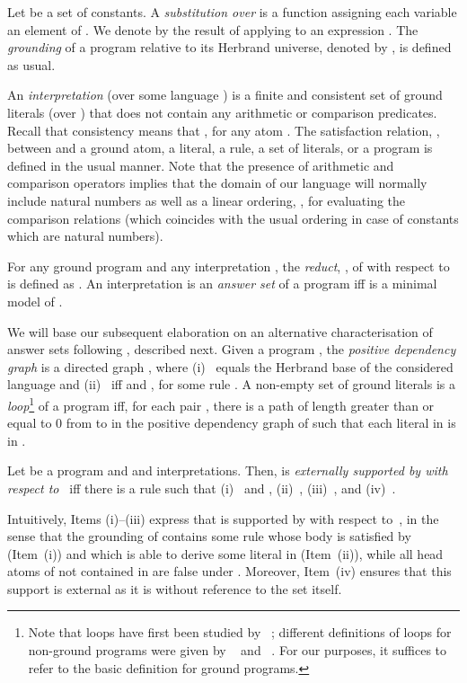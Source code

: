 \documentclass{tlp}
\newcommand{\wrt}{with respect to}
\begin{document}
Let  be a set of constants. A \emph{substitution over}  is a function  assigning each variable an element of .
We denote by  the result of applying  to an expression .
The \emph{grounding} of a  program  relative to its Herbrand universe, denoted by , is defined as usual.

An \emph{interpretation}  (over some language ) is a finite and consistent set of ground literals (over ) that does not contain any arithmetic or comparison predicates.
Recall that consistency means that , for any atom .
The satisfaction relation, , between  and a ground atom, a literal, 
a rule, a set of literals, or a program  is defined in the usual manner.
Note that the presence of arithmetic and comparison operators implies that the domain of our language will normally include natural numbers as well as a linear ordering, , 
for evaluating the comparison relations (which coincides with the usual ordering in case of constants which are natural numbers).

For any ground program  and any interpretation , the \emph{reduct}, , of  \wrt\  \cite{gelfond91}
is defined as 
.
An interpretation  is an \emph{answer set} of a program  iff  is  a minimal model of .


We will base our subsequent elaboration on an alternative characterisation of answer sets following , described next.
Given a program ,  the \emph{positive dependency graph} is a directed
graph , where 
(i)~ equals the Herbrand base of the considered language  and
(ii)~ iff  and , for some rule .
A non-empty set  of ground literals is  a \emph{loop}\footnote{Note that loops have first been studied by ~\citeyear{lin04}; different definitions of loops for non-ground programs were given by ~\citeyear{chen06} and ~\citeyear{lee08}.
For our purposes, it suffices to refer to the basic definition for ground programs.} of  a  program  iff,
for each pair ,
there is a path  of length greater than or equal to 0 from  to 
in the positive dependency graph of  such that each literal in 
is in . 

Let  be a program and  and  interpretations. Then,
 is \emph{externally supported by  \wrt\ } iff
there is a rule  
such that
(i)~ and ,
(ii)~,
(iii)~, and
(iv)~.

Intuitively, Items (i)--(iii) express that  is supported by  \wrt\ , in the sense that the grounding of  contains some rule  whose body is satisfied by  (Item~(i)) and which is able to derive some literal in  (Item~(ii)), while all head atoms of  not contained in  are false under .
Moreover, Item~(iv) ensures that this support is external as it is without
reference to the set  itself.
\end{document}
